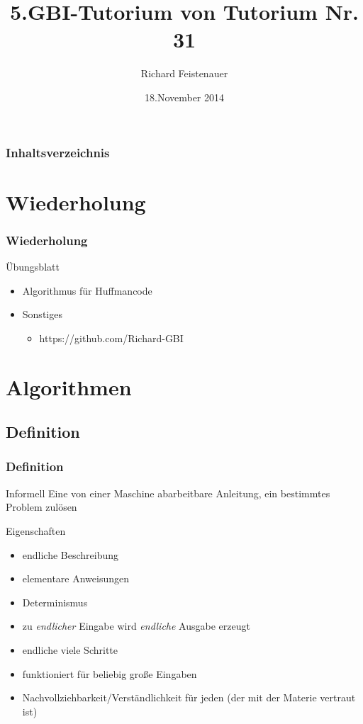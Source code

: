 \documentclass{beamer}
\author{Richard Feistenauer}
\title{5.GBI-Tutorium von Tutorium Nr. 31}
\date{18.November 2014}
\begin{document}
\begin {frame}
	\titlepage
\end {frame}

\begin {frame}
	\frametitle {Inhaltsverzeichnis}
	\tableofcontents
\end {frame}

\section{Wiederholung}
\begin{frame}
	\frametitle{Wiederholung}
	\begin{block}{Übungsblatt}
		\begin{itemize}
			\item Algorithmus für Huffmancode
			\item Sonstiges
			\begin{itemize}
				\item https://github.com/Richard-GBI
			\end{itemize}
		\end{itemize}
	\end{block}
\end{frame}

\section{Algorithmen}
\subsection{Definition}
\begin{frame}
	\frametitle{Definition}
	\begin{block}{Informell}
		Eine von einer Maschine abarbeitbare Anleitung, ein
		bestimmtes Problem zulösen
	\end{block}
	\begin{block}{Eigenschaften}
		\pause
		\begin{itemize}
			\item endliche Beschreibung
			\item elementare Anweisungen
			\item Determinismus
			\item zu \emph{endlicher} Eingabe wird \emph{endliche} 					Ausgabe erzeugt
			\item endliche viele Schritte
			\item funktioniert für beliebig große Eingaben
			\item Nachvollziehbarkeit/Verständlichkeit für jeden (der 			mit der Materie vertraut ist)
		\end{itemize}
	\end{block}
\end{frame}
\end{document}
